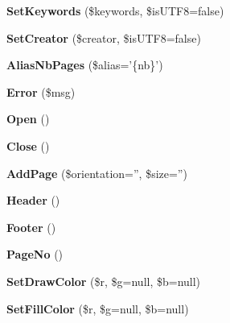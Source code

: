 \begin{DoxyCompactItemize}
\item 
\hypertarget{classFPDF_a97c034e7f4c04395a54f09f582544a97}{{\bfseries Set\+Keywords} (\$keywords, \$is\+U\+T\+F8=false)}\label{classFPDF_a97c034e7f4c04395a54f09f582544a97}

\item 
\hypertarget{classFPDF_ad528c02fc9104993d5b8c4d3f4a5ae00}{{\bfseries Set\+Creator} (\$creator, \$is\+U\+T\+F8=false)}\label{classFPDF_ad528c02fc9104993d5b8c4d3f4a5ae00}

\item 
\hypertarget{classFPDF_a519cf01024f5981364ec7cd2d5281253}{{\bfseries Alias\+Nb\+Pages} (\$alias='\{nb\}')}\label{classFPDF_a519cf01024f5981364ec7cd2d5281253}

\item 
\hypertarget{classFPDF_abbf9af8630c425b22b9199cc906ee1bb}{{\bfseries Error} (\$msg)}\label{classFPDF_abbf9af8630c425b22b9199cc906ee1bb}

\item 
\hypertarget{classFPDF_a6361408b654aa8ec619489c600492893}{{\bfseries Open} ()}\label{classFPDF_a6361408b654aa8ec619489c600492893}

\item 
\hypertarget{classFPDF_af6bcdd2acb114191b61065e85ff0b62c}{{\bfseries Close} ()}\label{classFPDF_af6bcdd2acb114191b61065e85ff0b62c}

\item 
\hypertarget{classFPDF_a121a87a0cf4fcc43eb6972d40a4d54b1}{{\bfseries Add\+Page} (\$orientation='', \$size='')}\label{classFPDF_a121a87a0cf4fcc43eb6972d40a4d54b1}

\item 
\hypertarget{classFPDF_ab1bedba6d1753b9e3f18ed3820743fd6}{{\bfseries Header} ()}\label{classFPDF_ab1bedba6d1753b9e3f18ed3820743fd6}

\item 
\hypertarget{classFPDF_aaa8da01869c5e5a75ff9150016dad08d}{{\bfseries Footer} ()}\label{classFPDF_aaa8da01869c5e5a75ff9150016dad08d}

\item 
\hypertarget{classFPDF_af97a0239f79f597b5c88cc68b385f7af}{{\bfseries Page\+No} ()}\label{classFPDF_af97a0239f79f597b5c88cc68b385f7af}

\item 
\hypertarget{classFPDF_a2699cc6ff46c7cf2953e5e740f456d75}{{\bfseries Set\+Draw\+Color} (\$r, \$g=null, \$b=null)}\label{classFPDF_a2699cc6ff46c7cf2953e5e740f456d75}

\item 
\hypertarget{classFPDF_ac01941b00b99afca24dec97591665a3c}{{\bfseries Set\+Fill\+Color} (\$r, \$g=null, \$b=null)}\label{classFPDF_ac01941b00b99afca24dec97591665a3c}


\end{DoxyCompactItemize}
